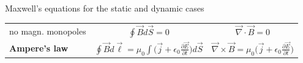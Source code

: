 \begin{frame}{Maxwell's equations for the static and dynamic cases}
{\begin{center}
{\begin{table}[H]
\begin{tabular}{|l|c|c|}
      no magn. monopoles &
        $\displaystyle  \oint \vec{B} d\vec{S} = 0$ &
        $\displaystyle  \vec{\nabla} \cdot \vec{B} = 0$ \\

      {\bf Ampere's law} &
        $\displaystyle \oint \vec{B} d\vec{\ell} = \mu_{0} \int \Big( \vec{j} + \epsilon_0 \frac{\partial \vec{E}}{\partial t}\Big) d\vec{S}$ &
        $\displaystyle \vec{\nabla} \times \vec{B} = \mu_{0} \Big( \vec{j} + \epsilon_0 \frac{\partial \vec{E}}{\partial t}\Big)$ \\
      \hline
    \end{tabular}
  \end{table}
}
\end{center}

}
\end{frame}
